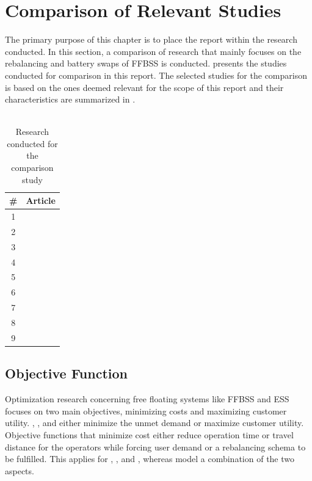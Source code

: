 \section{Comparison of Relevant Studies}\label{Comparison}

The primary purpose of this chapter is to place the report within the research conducted. In this section, a comparison of research that mainly focuses on the rebalancing and battery swaps of FFBSS is conducted.  presents the studies conducted for comparison in this report. The selected studies for the comparison is based on the ones deemed relevant for the scope of this report and their characteristics are summarized in .
\\\
\begin{table}[H]
    \centering
    \caption{Research conducted for the comparison study}
    \begin{tabular}{c| l}
        \# & Article \\
        \hline
        1 & \citet{caggiani_modeling_2018}\\
        2 & \citet{pal_free-floating_2017}\\
        3 & \citet{warrington_two-stage_2019}\\
        4 & \citet{du_static_2020}\\
        5 & \citet{liu_static_2018}\\
        6 & \citet{pender_stochastic_2020}\\
        7 & \citet{ciociola_e-scooter_2020}\\
        8 & \citet{masoud_heuristic_2019}\\
        9 & \citet{fosen_rebalancing_2020}\\
    \end{tabular}
    \label{comp_study_overview}
\end{table}

\subsection{Objective Function}\label{comparison_oj_func}

Optimization research concerning free floating systems like FFBSS and ESS focuses on two main objectives, minimizing costs and maximizing customer utility. \citet{caggiani_modeling_2018}, \citet{ciociola_e-scooter_2020}, and \citet{fosen_rebalancing_2020} either minimize the unmet demand or maximize customer utility. Objective functions that minimize cost either reduce operation time or travel distance for the operators while forcing user demand or a rebalancing schema to be fulfilled. This applies for \citet{pal_free-floating_2017}, \citet{warrington_two-stage_2019}, and \citet{masoud_heuristic_2019}, whereas \citet{liu_static_2018} model a combination of the two aspects. 

